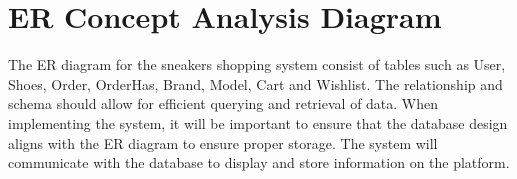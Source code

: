\section{ER Concept Analysis Diagram}
\hspace{1cm} The ER diagram for the sneakers shopping system consist of tables such as User, Shoes, Order, 
OrderHas, Brand, Model, Cart and Wishlist. The relationship and schema should allow for efficient 
querying and retrieval of data. When implementing the system, it will be important to ensure that the 
database design aligns with the ER diagram to ensure proper storage. The system will communicate with 
the database to display and store information on the platform.

